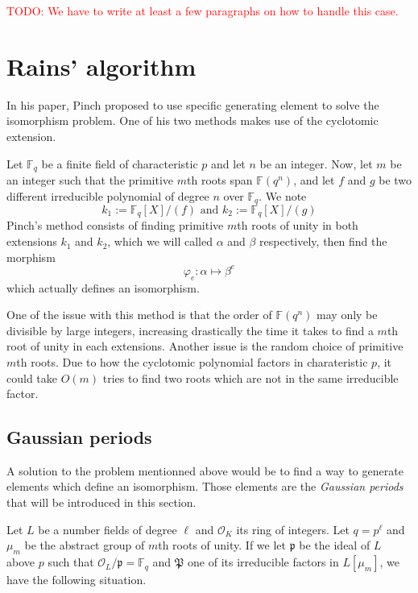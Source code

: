 \documentclass[12pt]{article}
\theoremstyle{plain}
\theoremstyle{definition}
\newcommand{\todo}[1]{\textcolor{red}{TODO: #1}}
\def\F{\ensuremath{\mathbb{F}}}
\newcounter{algorithm}
\begin{document}
\todo{We have to write at least a few paragraphs on how to handle this case.}


\section{Rains' algorithm}

In his paper, Pinch \cite{} proposed to use specific generating element to solve
the isomorphism problem. One of his two methods makes use of the cyclotomic
extension.

Let $\F_q$ be a finite field of characteristic $p$ and let $n$ be an integer. 
Now, let $m$ be an integer such that the primitive $m$th roots span 
$\F(q^n)$, and let $f$ and $g$ be two different irreducible polynomial of
degree $n$ over $\F_q$. We note
\begin{equation}
k_1 := \F_q[X]/(f)\text{ and }k_2 := \F_q[X]/(g)
\end{equation}
Pinch's method consists of finding primitive $m$th roots of unity in both extensions
$k_1$ and $k_2$, which we will called $\alpha$ and $\beta$ respectively, then
find the morphism
\begin{equation}
\varphi_e : \alpha\longmapsto\beta^e
\end{equation}
which actually defines an isomorphism.

One of the issue with this method is that the order of $\F(q^n)$ may only be
divisible by large integers, increasing drastically the time it takes to find a 
$m$th root of unity in each extensions. Another issue is the random choice of
primitive $m$th roots. Due to how the cyclotomic polynomial factors in
charateristic $p$, it could take $O(m)$ tries to find two roots which are not in
the same irreducible factor.


\subsection{Gaussian periods}

A solution to the problem mentionned above would be to find a way to generate
elements which define an isomorphism. Those elements are the \emph{Gaussian
periods} that will be introduced in this section.

Let $L$ be a number fields of degree $\ell$ and $\mathcal{O}_{K}$ its ring of
integers. Let $q = p^{\ell}$ and $\mu_m$ be the abstract group of $m$th roots of
unity. If we let $\mathfrak{p}$ be the ideal of $L$ above $p$ such that
$\mathcal{O}_L/\mathfrak{p} = \F_q$ and $\mathfrak{P}$ one of its irreducible 
factors in $L[\mu_m]$, we have the following situation.
\end{document}
